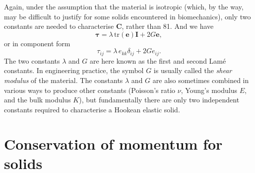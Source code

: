 \documentclass[a4paper,11pt]		{report}
\begin{document}
Again, under the assumption that the material is isotropic (which, by
the way, may be difficult to justify for some solids encountered in
biomechanics), only two constants are needed to characterise $\bm{C}$,
rather than 81. And we have
\begin{equation}
\bm{\tau}=\lambda\,\mathrm{tr}(\bm{e})\bm{I} + 2G\bm{e},
\label{eq.hookes}
\end{equation}
or in component form
\begin{equation}
\tau_{ij} = \lambda\,e_{kk}\delta_{ij} + 2Ge_{ij}.
\end{equation}
The two constants $\lambda$ and $G$ are here known as the first and
second Lam\'{e} constants. In engineering practice, the symbol $G$ is
usually called the \emph{shear modulus} of the material. The constants
$\lambda$ and $G$ are also sometimes combined in various ways to
produce other constants (Poisson's ratio $\nu$, Young's modulus $E$,
and the bulk modulus $K$), but fundamentally there are only two
independent constants required to characterise a Hookean elastic
solid.


\section{Conservation of momentum for solids}
\end{document}
